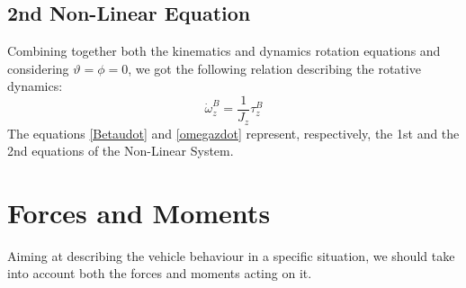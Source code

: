 \subsection{2nd Non-Linear Equation}
	Combining together both the kinematics and dynamics rotation equations and considering $\vartheta = \phi = 0$, we got the following relation describing the rotative dynamics:
	\begin{equation} \label{omegazdot}
		\dot{\omega}_{z}^{B} = \frac{1}{J_{z}} \tau_{z}^{B}
	\end{equation}
	The equations \ref{Betaudot} and \ref{omegazdot} represent, respectively, the 1st and the 2nd equations of the Non-Linear System.
\section{Forces and Moments}
Aiming at describing the vehicle behaviour in a specific situation, we should take into account both the forces and moments acting on it. 


